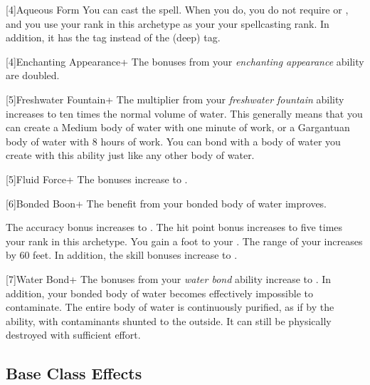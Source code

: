     [4]{Aqueous Form} You can cast the  spell.
      When you do, you do not require  or , and you use your rank in this archetype as your your spellcasting rank.
      In addition, it has the \atAttune tag instead of the \atAttune (deep) tag.

    [4]{Enchanting Appearance+} The bonuses from your \textit{enchanting appearance} ability are doubled.

    [5]{Freshwater Fountain+} The multiplier from your \textit{freshwater fountain} ability increases to ten times the normal volume of water.
    This generally means that you can create a Medium body of water with one minute of work, or a Gargantuan body of water with 8 hours of work.
    You can bond with a body of water you create with this ability just like any other body of water.

    [5]{Fluid Force+} The bonuses increase to .

    [6]{Bonded Boon+} The benefit from your bonded body of water improves.
    \begin{raggeditemize}
       The accuracy bonus increases to .
       The hit point bonus increases to five times your rank in this archetype.
       You gain a  foot  to your .
       The range of your  increases by 60 feet.
        In addition, the skill bonuses increase to .
    \end{raggeditemize}

    [7]{Water Bond+} The bonuses from your \textit{water bond} ability increase to .
    In addition, your bonded body of water becomes effectively impossible to contaminate.
    The entire body of water is continuously purified, as if by the  ability, with contaminants shunted to the outside.
    It can still be physically destroyed with sufficient effort.

  \subsection{Base Class Effects}
    \mediumhpprogressiontable


